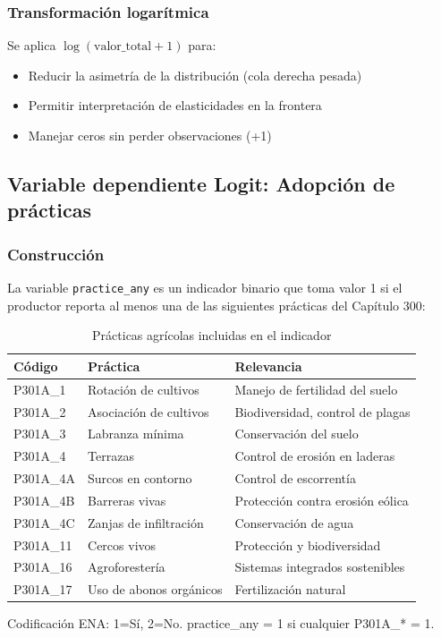 \documentclass[11pt,a4paper]{article}
\begin{document}
\subsubsection{Transformación logarítmica}
Se aplica $\log(\text{valor\_total} + 1)$ para:
\begin{itemize}
    \item Reducir la asimetría de la distribución (cola derecha pesada)
    \item Permitir interpretación de elasticidades en la frontera
    \item Manejar ceros sin perder observaciones (+1)
\end{itemize}

\subsection{Variable dependiente Logit: Adopción de prácticas}

\subsubsection{Construcción}
La variable \texttt{practice\_any} es un indicador binario que toma valor 1 si el productor reporta al menos una de las siguientes prácticas del Capítulo 300:

\begin{table}[H]
\centering
\caption{Prácticas agrícolas incluidas en el indicador}
\label{tab:practices_detail}
\begin{threeparttable}
\small
\begin{tabular}{p{2cm}p{5.5cm}p{5.5cm}}
\toprule
\textbf{Código} & \textbf{Práctica} & \textbf{Relevancia} \\
\midrule
P301A\_1 & Rotación de cultivos & Manejo de fertilidad del suelo \\
P301A\_2 & Asociación de cultivos & Biodiversidad, control de plagas \\
P301A\_3 & Labranza mínima & Conservación del suelo \\
P301A\_4 & Terrazas & Control de erosión en laderas \\
P301A\_4A & Surcos en contorno & Control de escorrentía \\
P301A\_4B & Barreras vivas & Protección contra erosión eólica \\
P301A\_4C & Zanjas de infiltración & Conservación de agua \\
P301A\_11 & Cercos vivos & Protección y biodiversidad \\
P301A\_16 & Agroforestería & Sistemas integrados sostenibles \\
P301A\_17 & Uso de abonos orgánicos & Fertilización natural \\
\bottomrule
\end{tabular}
\begin{tablenotes}
\footnotesize
\item Codificación ENA: 1=Sí, 2=No. practice\_any = 1 si cualquier P301A\_* = 1.
\end{tablenotes}
\end{threeparttable}
\end{table}
\end{document}
